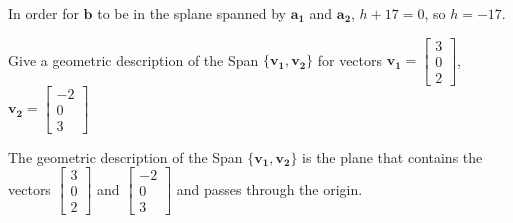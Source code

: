 \documentclass{mathhomework}
\newcommand{\Vect}[1]{\pmb{#1}}
\begin{document}
\begin{problem}[1.3\#17]
\begin{solution}
        In order for $\Vect{b}$ to be in the splane spanned by $\Vect{a_1}$ and $\Vect{a_2}$, $h + 17 = 0$, so $h = -17$.
    \end{solution}
\end{problem}

\pagebreak
\begin{problem}[1.3\#19]
    Give a geometric description of the Span $\{\Vect{v_1}, \Vect{v_2}\}$ for vectors 
    $\Vect{v_1} = \begin{bmatrix}3 \\ 0 \\ 2\end{bmatrix}$,
    $\Vect{v_2} = \begin{bmatrix}-2 \\ 0 \\ 3\end{bmatrix}$

    \begin{solution}
        The geometric description of the Span $\{\Vect{v_1}, \Vect{v_2}\}$ is the plane that contains the vectors $\begin{bmatrix}3 \\ 0 \\ 2\end{bmatrix}$ and $\begin{bmatrix}-2 \\ 0 \\ 3\end{bmatrix}$ and passes through the origin.
    \end{solution}
\end{problem}
\end{document}
